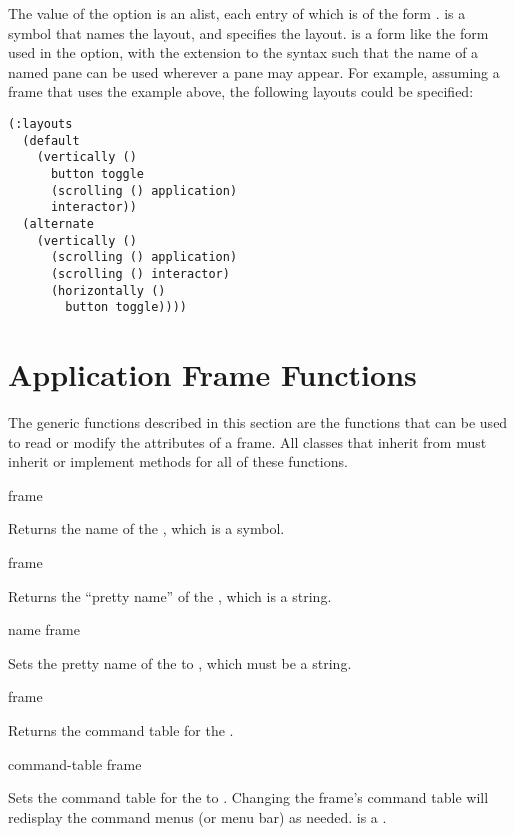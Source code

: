 The value of the  option is an alist, each entry of which is of the
form .   is a symbol that names the layout, and
 specifies the layout.   is a form like the form used in
the  option, with the extension to the syntax such that the name of a
named pane can be used wherever a pane may appear.  For example, assuming a
frame that uses the  example above, the following layouts could be
specified:

\begin{verbatim}
(:layouts
  (default 
    (vertically ()
      button toggle 
      (scrolling () application)
      interactor))
  (alternate
    (vertically ()
      (scrolling () application)
      (scrolling () interactor)
      (horizontally ()
        button toggle))))
\end{verbatim}


\section {Application Frame Functions}

The generic functions described in this section are the functions that can be
used to read or modify the attributes of a frame.  All classes that inherit from
 must inherit or implement methods for all of these
functions.

 {frame}

Returns the name of the  , which is a symbol.

 {frame}

Returns the ``pretty name'' of the  , which is a string.

 {name frame}

Sets the pretty name of the   to , which must
be a string.


 {frame}

Returns the command table for the  .

 {command-table frame}

Sets the command table for the   to .
Changing the frame's command table will redisplay the command menus (or menu
bar) as needed.   is a .



